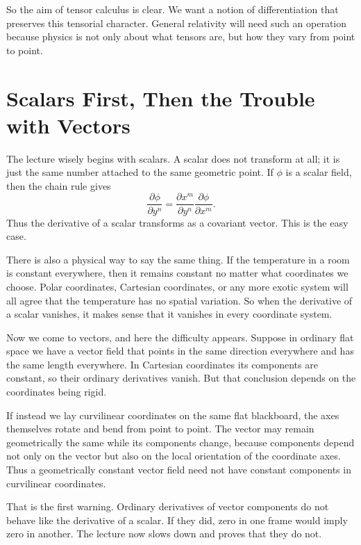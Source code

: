 So the aim of tensor calculus is clear. We want a notion of differentiation that preserves this tensorial character. General relativity will need such an operation because physics is not only about what tensors are, but how they vary from point to point.

\section{Scalars First, Then the Trouble with Vectors}

The lecture wisely begins with scalars. A scalar does not transform at all; it is just the same number attached to the same geometric point. If \(\phi\) is a scalar field, then the chain rule gives
\begin{equation}
\frac{\partial \phi}{\partial y^n}
=
\frac{\partial x^m}{\partial y^n}
\frac{\partial \phi}{\partial x^m}.
\end{equation}
Thus the derivative of a scalar transforms as a covariant vector. This is the easy case.

There is also a physical way to say the same thing. If the temperature in a room is constant everywhere, then it remains constant no matter what coordinates we choose. Polar coordinates, Cartesian coordinates, or any more exotic system will all agree that the temperature has no spatial variation. So when the derivative of a scalar vanishes, it makes sense that it vanishes in every coordinate system.

Now we come to vectors, and here the difficulty appears. Suppose in ordinary flat space we have a vector field that points in the same direction everywhere and has the same length everywhere. In Cartesian coordinates its components are constant, so their ordinary derivatives vanish. But that conclusion depends on the coordinates being rigid.

If instead we lay curvilinear coordinates on the same flat blackboard, the axes themselves rotate and bend from point to point. The vector may remain geometrically the same while its components change, because components depend not only on the vector but also on the local orientation of the coordinate axes. Thus a geometrically constant vector field need not have constant components in curvilinear coordinates.

That is the first warning. Ordinary derivatives of vector components do not behave like the derivative of a scalar. If they did, zero in one frame would imply zero in another. The lecture now slows down and proves that they do not.

